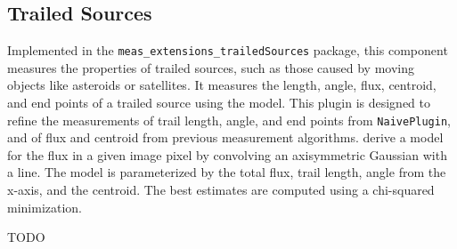 \subsection{Trailed Sources}
\label{sec:trailed-sources}

Implemented in the \texttt{meas\_extensions\_trailed\-Sources} package, this component measures the properties of trailed sources, such as those caused by moving objects like asteroids or satellites.
It measures the length, angle, flux, centroid, and end points of a trailed source using the \citet{2012PASP..124.1197V} model.
This plugin is designed to refine the measurements of trail length, angle, and end points from \texttt{NaivePlugin}, and of flux and centroid from previous measurement algorithms.
\citet{2012PASP..124.1197V} derive a model for the flux in a given image pixel by convolving an axisymmetric Gaussian with a line.
The model is parameterized by the total flux, trail length, angle from the x-axis, and the centroid.
The best estimates are computed using a chi-squared minimization.

TODO
